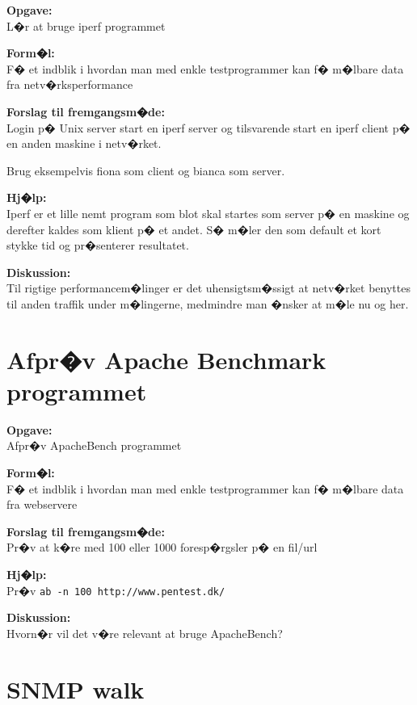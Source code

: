 \documentclass[a4paper,11pt,notitlepage]{oevelser}
\begin{document}
{\bfseries Opgave:} \\
L�r at bruge iperf programmet

{\bfseries Form�l:}\\
F� et indblik i hvordan man med enkle testprogrammer kan f� m�lbare data fra netv�rksperformance

{\bfseries Forslag til fremgangsm�de:} \\
Login p� Unix server start en iperf server og tilsvarende start en iperf client p� en anden maskine i netv�rket.

Brug eksempelvis fiona som client og bianca som server.

{\bfseries Hj�lp:} \\
Iperf er et lille nemt program som blot skal startes som server p� en maskine og derefter kaldes som klient p� et andet. S� m�ler den som default et kort stykke tid og pr�senterer resultatet.

{\bfseries Diskussion:}\\
Til rigtige performancem�linger er det uhensigtsm�ssigt at netv�rket benyttes til anden traffik under m�lingerne, medmindre man �nsker at m�le nu og her.



\chapter{Afpr�v Apache Benchmark programmet}
\label{ex:apache-benchmark}

{\bfseries Opgave:}\\
Afpr�v ApacheBench programmet

{\bfseries Form�l:}\\
F� et indblik i hvordan man med enkle testprogrammer kan f� m�lbare data fra webservere

{\bfseries Forslag til fremgangsm�de:}\\
Pr�v at k�re med 100 eller 1000 foresp�rgsler p� en fil/url

{\bfseries Hj�lp:}\\
Pr�v \verb+ab -n 100 http://www.pentest.dk/+


{\bfseries Diskussion:}\\
Hvorn�r vil det v�re relevant at bruge ApacheBench?



\chapter{SNMP walk}
\label{ex:snmpwalk}
\end{document}
